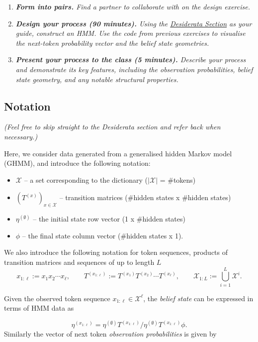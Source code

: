 \documentclass[11pt]{article}
\begin{document}
\begin{enumerate}
\item
  \emph{\textbf{Form into pairs.} Find a partner to collaborate with on the design exercise.}
\item
  \emph{\textbf{Design your process (90 minutes).} Using the \hyperref[desiderata]{Desiderata Section} as your guide, construct an HMM. Use the code from previous exercises to visualise the next-token probability vector and the belief state geometries.}
\item
  \emph{\textbf{Present your process to the class (5 minutes).} Describe your process and demonstrate its key features, including the observation probabilities, belief state geometry, and any notable structural properties.}
\end{enumerate}

\subsection{Notation}\label{notation}

\emph{(Feel free to skip straight to the Desiderata section and refer back when necessary.)}

Here, we consider data generated from a generalised hidden Markov model (GHMM), and introduce the following notation:

\begin{itemize}
\item
  \(\mathcal{X}\) -- a set corresponding to the dictionary (\(|\mathcal{X}|\) = \#tokens)
\item
  \((T^{(x)})_{x \in \mathcal{X}}\) -- transition matrices (\#hidden states x \#hidden states)
\item
  \(\eta^{(\emptyset)}\) -- the initial state row vector (1 x \#hidden states)
\item
  \(\phi\) -- the final state column vector (\#hidden states x 1).
\end{itemize}

We also introduce the following notation for token sequences, products of transition matrices and sequences of up to length \(L\)
\[
x_{1:\ell} := x_1 x_2 \cdots x_{\ell}, \qquad T^{(x_{1:\ell})} := T^{(x_1)} T^{(x_2)} \cdots T^{(x_\ell)}, \qquad \mathcal{X}_{1:L} := \bigcup_{i=1}^{L} \mathcal{X}^i .
\]

Given the observed token sequence \(x_{1:\ell}\in \mathcal{X}^\ell\), the \emph{belief state} can be expressed in terms of HMM data as

\[
\eta^{(x_{1:\ell})} = \eta^{(\emptyset)} T^{(x_{1:\ell})} / \eta^{(\emptyset)} T^{(x_{1:\ell})} \phi .
\]
Similarly the vector of next token \emph{observation probabilities} is given by
\end{document}
